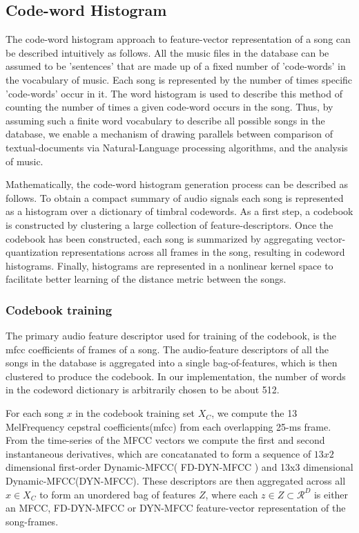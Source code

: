 \documentclass[12pt]{article}
\begin{document}
\subsection{Code-word Histogram}
The code-word histogram \cite{codewordHist} approach to feature-vector representation of a song can be described intuitively as follows. All the music files in the database can be assumed to be 'sentences' that are made up of a fixed number of 'code-words' in the vocabulary of music. Each song is represented by the number of times specific 'code-words' occur in it. The word histogram is used to describe this method of counting the number of times a given code-word occurs in the song. Thus, by assuming such a finite word vocabulary to describe all possible songs in the database, we enable a  mechanism of drawing parallels between comparison of textual-documents via Natural-Language processing algorithms, and the analysis of music. 

Mathematically, the code-word histogram generation process can be described as follows. To obtain a compact summary of audio signals each song is represented as a histogram over a dictionary of timbral codewords. As a first step, a codebook is constructed by clustering a large collection of feature-descriptors. Once the codebook has been constructed, each song is summarized by aggregating vector-quantization representations across all frames in the song, resulting in codeword histograms. Finally, histograms are represented in a nonlinear kernel space to facilitate better learning of the distance metric between the songs. 

\subsubsection{Codebook training}
The primary audio feature descriptor used for training of the codebook, is the mfcc coefficients of frames of a song. The audio-feature descriptors of all the songs in the database is aggregated into a single bag-of-features, which is then clustered to produce the codebook. In our implementation, the number of words in the codeword dictionary is arbitrarily chosen to be about 512. 

For each song $x$ in the codebook training set $X_C$, we compute the 13 MelFrequency cepstral coefficients(mfcc) from each overlapping 25-ms frame. From the time-series of the MFCC vectors we compute the first and second instantaneous derivatives, which are concatanated to form a sequence of $13x2$ dimensional first-order Dynamic-MFCC( FD-DYN-MFCC ) and 13x3 dimensional Dynamic-MFCC(DYN-MFCC). These descriptors are then aggregated across all $x \in X_C$ to form an unordered bag of features $Z$, where each $ z \in Z \subset \mathcal{R}^D $ is either an MFCC, FD-DYN-MFCC or DYN-MFCC feature-vector representation of the song-frames.
\end{document}
